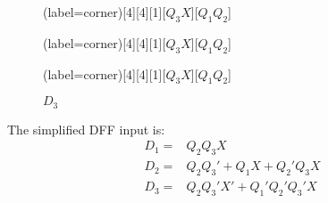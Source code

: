 \documentclass[a4paper,12pt]{article}
\begin{document}
\begin{figure}[H]
	\begin{minipage}{0.32\linewidth}
		\centering
		\begin{karnaugh-map}(label=corner)[4][4][1][$Q_3X$][$Q_1Q_2$]
			\autoterms[X]
		\end{karnaugh-map}
		\caption*{$D_1$}
	\end{minipage}
	\begin{minipage}{0.32\linewidth}
		\centering
		\begin{karnaugh-map}(label=corner)[4][4][1][$Q_3X$][$Q_1Q_2$]
			\autoterms[X]
		\end{karnaugh-map}
		\caption*{$D_2$}
	\end{minipage}
	\begin{minipage}{0.32\linewidth}
		\centering
		\begin{karnaugh-map}(label=corner)[4][4][1][$Q_3X$][$Q_1Q_2$]
			\autoterms[X]
		\end{karnaugh-map}
		\caption*{$D_3$}
	\end{minipage}
\end{figure}

The simplified DFF input is:
\begin{align*}
	D_1 =& Q_2Q_3X \\
	D_2 =& Q_2Q_3' + Q_1X + Q_2'Q_3X \\
	D_3 =& Q_2Q_3'X' + Q_1'Q_2'Q_3'X 
\end{align*}
\end{document}
